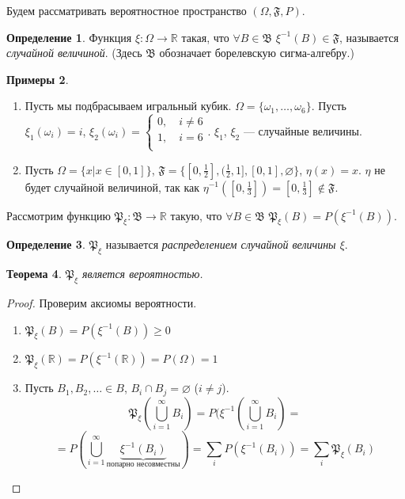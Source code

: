 \documentclass[11pt,openany,a4paper]{scrartcl}
\theoremstyle{plain}
\newtheorem{theorem}{Теорема}[subsection]
\theoremstyle{definition}
\newtheorem{definition}[theorem]{Определение}
\newtheorem{examples}[theorem]{Примеры}
\newcommand\mb{\mathbb}
\newcommand\real{\mb R}
\newcommand{\distr}{\mathfrak P_\xi}
\begin{document}
Будем рассматривать вероятностное пространство $(\Omega, \mathfrak{F}, P)$.

\begin{definition}
    Функция $\xi: \Omega \to \real$ такая, что
    $\forall B \in \mathfrak B$
    $\xi^{-1}(B) \in \mathfrak F$, называется \emph{случайной величиной}.
    (Здесь $\mathfrak B$ обозначает борелевскую сигма-алгебру.)
\end{definition}
\begin{examples}
    \begin{enumerate}
        \item Пусть мы подбрасываем игральный кубик.
        $\Omega = \{\omega_1,\ldots,\omega_6\}$. Пусть $\xi_1(\omega_i) = i$,
        $\xi_2(\omega_i) =
        \begin{cases}
            0,\quad i \neq 6\\
            1,\quad i = 6\\  
        \end{cases}
        $. $\xi_1$, $\xi_2$ — случайные величины.
        \item Пусть $\Omega = \{x \big| x \in [0, 1]\}$,
        $\mathfrak F = \{[0, \frac{1}{2}],
        (\frac{1}{2}, 1], [0, 1], \varnothing\}$,
        $\eta(x) = x$. $\eta$ не будет случайной величиной, так как
        $\eta^{-1}([0, \frac{1}{3}]) = [0, \frac{1}{3}] \notin \mathfrak F$.
    \end{enumerate}
\end{examples}

Рассмотрим функцию $\mathfrak P_\xi: \mathfrak B \to \real$ такую, что
$\forall B \in \mathfrak B$ $\mathfrak P_\xi(B) = P(\xi^{-1}(B))$.

\begin{definition}
    $\mathfrak P_\xi$ называется \emph{распределением случайной величины $\xi$}.
\end{definition}
\begin{theorem}
    $\mathfrak P_\xi$ является вероятностью.
\end{theorem}
\begin{proof}
    Проверим аксиомы вероятности.
    \begin{enumerate}
        \item $\distr(B) = P(\xi^{-1}(B)) \geqslant 0$
        \item $\distr (\real) =P(\xi^{-1}(\real)) = P(\Omega) = 1$
        \item Пусть $B_1, B_2, \ldots \in B$, $B_i \cap B_j = \varnothing$
        ($i \neq j$).
        $$
        \distr (\bigcup\limits_{i=1}^\infty B_i) =
        P(\xi^{-1}(\bigcup\limits_{i=1}^\infty B_i) =
        $$
        $$
        = P(\bigcup\limits_{i=1}^\infty \underbrace{\xi^{-1}
        (B_i)}_{\text{попарно несовместны}}) =
        \sum\limits_i P(\xi^{-1}(B_i)) = \sum\limits_i \distr (B_i)
        $$
    \end{enumerate}
\end{proof}
\end{document}
